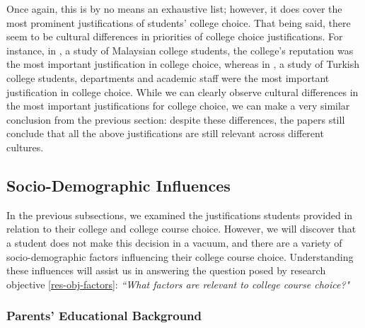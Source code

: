 Once again, this is by no means an exhaustive list; however, it does cover the most prominent justifications of students' college choice.
That being said, there seem to be cultural differences 
in priorities of college choice justifications.
For instance, in \cite{baharun2010institutional}, a study of Malaysian college students, the college's reputation was the most important justification in college choice,
whereas in \cite{telli2006university}, a study of Turkish college students, departments and academic staff were the most important justification in college choice.
While we can clearly observe cultural differences in the most important justifications for college choice,
we can make a very similar conclusion from the previous section:
despite these differences, the papers still
conclude that all the above justifications are still relevant across different cultures.

\subsection{Socio-Demographic Influences}
\label{sec:socio-demographic-influences}

In the previous subsections, we examined the
justifications students provided in relation to their college and college course choice.
However, we will discover that a student does not make this decision in a vacuum,
and there are a variety of socio-demographic factors influencing their college course choice.
Understanding these influences will assist us in answering the question posed by research objective \ref{res-obj-factors}:
\emph{``What factors are relevant to college course choice?"}

\subsubsection{Parents' Educational Background}

